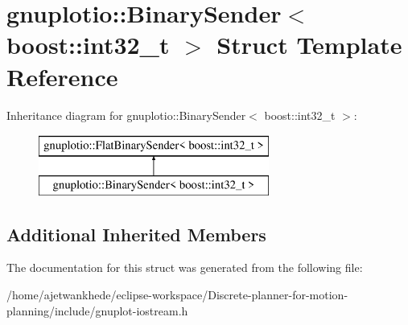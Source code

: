 \hypertarget{structgnuplotio_1_1BinarySender_3_01boost_1_1int32__t_01_4}{}\section{gnuplotio\+:\+:Binary\+Sender$<$ boost\+:\+:int32\+\_\+t $>$ Struct Template Reference}
\label{structgnuplotio_1_1BinarySender_3_01boost_1_1int32__t_01_4}
Inheritance diagram for gnuplotio\+:\+:Binary\+Sender$<$ boost\+:\+:int32\+\_\+t $>$\+:\begin{figure}[H]
\begin{center}
\leavevmode
\includegraphics[height=2.000000cm]{structgnuplotio_1_1BinarySender_3_01boost_1_1int32__t_01_4}
\end{center}
\end{figure}
\subsection*{Additional Inherited Members}


The documentation for this struct was generated from the following file\+:\begin{DoxyCompactItemize}
\item 
/home/ajetwankhede/eclipse-\/workspace/\+Discrete-\/planner-\/for-\/motion-\/planning/include/gnuplot-\/iostream.\+h\end{DoxyCompactItemize}
